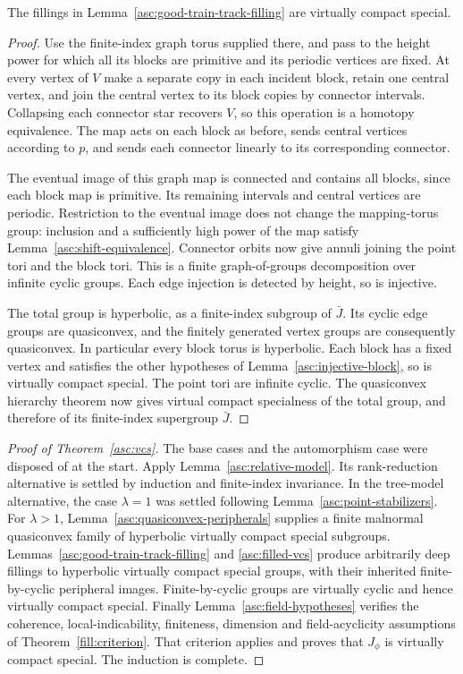 \begin{lemma}\label{asc:filled-vcs}
The fillings in Lemma~\ref{asc:good-train-track-filling} are virtually
compact special.
\end{lemma}

\begin{proof}
Use the finite-index graph torus supplied there, and pass to the height
power for which all its blocks are primitive and its periodic vertices
are fixed. At every vertex of $V$ make a separate copy in each incident
block, retain one central vertex, and join the central vertex to its
block copies by connector intervals. Collapsing each connector star
recovers $V$, so this operation is a homotopy equivalence. The map acts
on each block as before, sends central vertices according to $p$, and
sends each connector linearly to its corresponding connector.

The eventual image of this graph map is connected and contains all
blocks, since each block map is primitive. Its remaining intervals and
central vertices are periodic. Restriction to the eventual image does
not change the mapping-torus group: inclusion and a sufficiently high
power of the map satisfy Lemma~\ref{asc:shift-equivalence}. Connector
orbits now give annuli joining the point tori and the block tori.
This is a finite graph-of-groups decomposition over infinite cyclic
groups. Each edge injection is detected by height, so is injective.

The total group is hyperbolic, as a finite-index subgroup of $\bar J$.
Its cyclic edge groups are quasiconvex, and the finitely generated
vertex groups are consequently quasiconvex. In particular every block
torus is hyperbolic. Each block has a fixed vertex and satisfies the
other hypotheses of Lemma~\ref{asc:injective-block}, so is virtually
compact special. The point tori are infinite cyclic. The quasiconvex
hierarchy theorem \cite{Wise2021} now gives virtual compact specialness
of the total group, and therefore of its finite-index supergroup
$\bar J$.
\end{proof}

\begin{proof}[Proof of Theorem~\ref{asc:vcs}]
The base cases and the automorphism case were disposed of at the start.
Apply Lemma~\ref{asc:relative-model}. Its rank-reduction alternative is
settled by induction and finite-index invariance. In the tree-model
alternative, the case $\lambda=1$ was settled following
Lemma~\ref{asc:point-stabilizers}. For $\lambda>1$,
Lemma~\ref{asc:quasiconvex-peripherals} supplies a finite malnormal
quasiconvex family of hyperbolic virtually compact special subgroups.
Lemmas~\ref{asc:good-train-track-filling} and \ref{asc:filled-vcs}
produce arbitrarily deep fillings to hyperbolic virtually compact
special groups, with their inherited finite-by-cyclic peripheral images.
Finite-by-cyclic groups are virtually cyclic and hence virtually compact
special. Finally Lemma~\ref{asc:field-hypotheses} verifies the coherence,
local-indicability, finiteness, dimension and field-acyclicity assumptions
of Theorem~\ref{fill:criterion}. That criterion applies and proves that
$J_\phi$ is virtually compact special. The induction is complete.
\end{proof}

